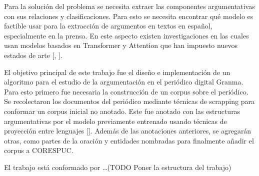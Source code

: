 
Para la solución del problema se necesita extraer las componentes argumentativas con sus relaciones
y clasificaciones. Para esto se necesita encontrar qué modelo es factible usar para la extracción de
argumentos en textos en español, especialmente en la prensa. En este aspecto existen investigaciones
en las cuales usan modelos basados en Transformer y Attention que han impuesto nuevos estados de arte
[\cite{mayer2020transformer}, \cite{galassi2021deep}].



El objetivo principal de este trabajo fue el diseño e implementación de un algoritmo para 
el estudio de la argumentación en el periódico digital Granma. Para esto primero
fue necesaria la construcción de un corpus sobre el periódico. Se recolectaron los documentos
del periódico mediante técnicas de scrapping para conformar un corpus inicial no anotado. Este
fue anotado con las estructuras argumentativas por el modelo previamente entrenado usando técnicas 
de proyección entre lenguajes [\cite{eger2018cross}]. Además de las anotaciones anteriores, se agregarán 
otras, como partes de la oración y entidades nombradas para finalmente añadir el corpus a CORESPUC.


El trabajo está conformado por \dots (TODO Poner la estructura del trabajo)


